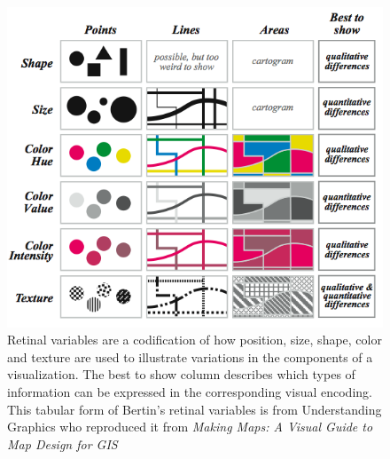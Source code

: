\documentclass[../main.tex]{subfiles}
\begin{document}
\label{sec:intro_visual_variables}
\begin{figure}[H]
\includegraphics[width=1\textwidth]{figures/intro/retinal_variables.png}
\caption{Retinal variables are a codification of how position, size, shape, color and texture are used to illustrate variations in the components of a visualization. The best to show column describes which types of information can be expressed in the corresponding visual encoding. This tabular form of Bertin's retinal variables is from Understanding Graphics \cite{malamedInformationDisplayTips2010} who reproduced it from \textit{Making Maps: A Visual Guide to Map Design for GIS} 
\cite{krygierMakingMapsVisual2005}}
\label{fig:intro_retinal_variables}
\end{figure}
\end{document}
